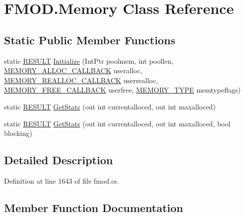 \hypertarget{class_f_m_o_d_1_1_memory}{}\section{F\+M\+O\+D.\+Memory Class Reference}
\label{class_f_m_o_d_1_1_memory}
\subsection*{Static Public Member Functions}
\begin{DoxyCompactItemize}
\item 
static \hyperlink{namespace_f_m_o_d_a305d1176ef3f8c8815861a60407ac33d}{R\+E\+S\+U\+LT} \hyperlink{class_f_m_o_d_1_1_memory_a6a15839b63f1f6df1ee41d192026d8c4}{Initialize} (Int\+Ptr poolmem, int poollen, \hyperlink{namespace_f_m_o_d_aff9ff44d1da401acbc19faf64e06a776}{M\+E\+M\+O\+R\+Y\+\_\+\+A\+L\+L\+O\+C\+\_\+\+C\+A\+L\+L\+B\+A\+CK} useralloc, \hyperlink{namespace_f_m_o_d_a3d035f4158c569e31902d9ad59ab43f0}{M\+E\+M\+O\+R\+Y\+\_\+\+R\+E\+A\+L\+L\+O\+C\+\_\+\+C\+A\+L\+L\+B\+A\+CK} userrealloc, \hyperlink{namespace_f_m_o_d_aa6d78ad454bb4b25659d9de9ca61fc42}{M\+E\+M\+O\+R\+Y\+\_\+\+F\+R\+E\+E\+\_\+\+C\+A\+L\+L\+B\+A\+CK} userfree, \hyperlink{namespace_f_m_o_d_a3eb4c9654cbf371b668f8eb46358e931}{M\+E\+M\+O\+R\+Y\+\_\+\+T\+Y\+PE} memtypeflags)
\item 
static \hyperlink{namespace_f_m_o_d_a305d1176ef3f8c8815861a60407ac33d}{R\+E\+S\+U\+LT} \hyperlink{class_f_m_o_d_1_1_memory_a22701e4dd0dfedf69cbcece503cc3dc3}{Get\+Stats} (out int currentalloced, out int maxalloced)
\item 
static \hyperlink{namespace_f_m_o_d_a305d1176ef3f8c8815861a60407ac33d}{R\+E\+S\+U\+LT} \hyperlink{class_f_m_o_d_1_1_memory_a9b18082622b96b6a8d7fb2fa5cb30fca}{Get\+Stats} (out int currentalloced, out int maxalloced, bool blocking)
\end{DoxyCompactItemize}


\subsection{Detailed Description}


Definition at line 1643 of file fmod.\+cs.



\subsection{Member Function Documentation}
\mbox{\label{class_f_m_o_d_1_1_memory_a22701e4dd0dfedf69cbcece503cc3dc3}} 
